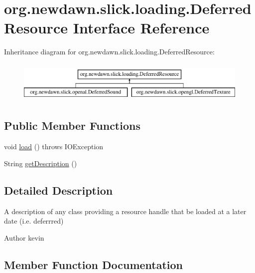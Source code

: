 \hypertarget{interfaceorg_1_1newdawn_1_1slick_1_1loading_1_1_deferred_resource}{}\section{org.\+newdawn.\+slick.\+loading.\+Deferred\+Resource Interface Reference}
\label{interfaceorg_1_1newdawn_1_1slick_1_1loading_1_1_deferred_resource}
Inheritance diagram for org.\+newdawn.\+slick.\+loading.\+Deferred\+Resource\+:\begin{figure}[H]
\begin{center}
\leavevmode
\includegraphics[height=2.000000cm]{interfaceorg_1_1newdawn_1_1slick_1_1loading_1_1_deferred_resource}
\end{center}
\end{figure}
\subsection*{Public Member Functions}
\begin{DoxyCompactItemize}
\item 
void \mbox{\hyperlink{interfaceorg_1_1newdawn_1_1slick_1_1loading_1_1_deferred_resource_a08c6171e3a44634c06c9160f5b785ad6}{load}} ()  throws I\+O\+Exception
\item 
String \mbox{\hyperlink{interfaceorg_1_1newdawn_1_1slick_1_1loading_1_1_deferred_resource_ab529c610c01ad0aaab6361c13010ba06}{get\+Description}} ()
\end{DoxyCompactItemize}


\subsection{Detailed Description}
A description of any class providing a resource handle that be loaded at a later date (i.\+e. deferrred)

\begin{DoxyAuthor}{Author}
kevin 
\end{DoxyAuthor}


\subsection{Member Function Documentation}
\mbox{\label{interfaceorg_1_1newdawn_1_1slick_1_1loading_1_1_deferred_resource_ab529c610c01ad0aaab6361c13010ba06}} 

